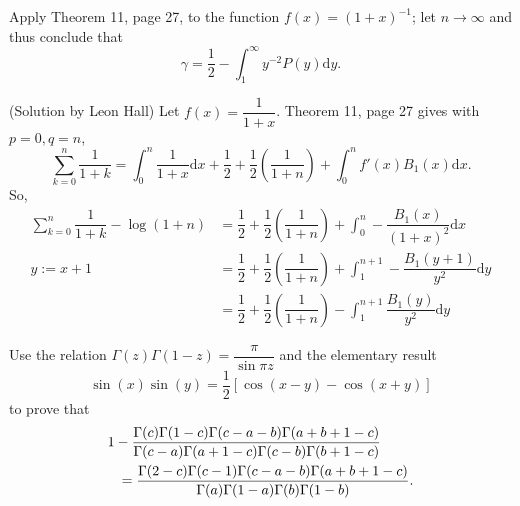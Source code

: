 \begin{problem}\label{problem14chapter2}
Apply Theorem 11, page 27, to the function $f(x) = (1+x)^{-1}$; let $n \rightarrow \infty$ and thus conclude that
$$\gamma = \dfrac{1}{2} - \displaystyle\int_1^{\infty} y^{-2} P(y) \mathrm{d}y.$$
\end{problem}
\begin{solution}(Solution by Leon Hall)
Let $f(x) = \dfrac{1}{1+x}$. Theorem 11, page 27 gives with $p=0, q=n$, 
$$\displaystyle\sum_{k=0}^n \dfrac{1}{1+k} = \displaystyle\int_0^n \dfrac{1}{1+x} \mathrm{d}x + \dfrac{1}{2} + \dfrac{1}{2} \left( \dfrac{1}{1+n} \right) + \displaystyle\int_0^n f'(x) B_1(x) \mathrm{d}x.$$
So,
$$\begin{array}{ll}
\displaystyle\sum_{k=0}^n \dfrac{1}{1+k} - \log(1+n) &= \dfrac{1}{2} + \dfrac{1}{2} \left( \dfrac{1}{1+n} \right) + \displaystyle\int_0^n - \dfrac{B_1(x)}{(1+x)^2} \mathrm{d}x \\
y:=x+1 &= \dfrac{1}{2} + \dfrac{1}{2} \left( \dfrac{1}{1+n} \right) + \displaystyle\int_1^{n+1} - \dfrac{B_1(y+1)}{y^2} \mathrm{d}y \\
&= \dfrac{1}{2} + \dfrac{1}{2} \left( \dfrac{1}{1+n} \right) - \displaystyle\int_1^{n+1} \dfrac{B_1(y)}{y^2} \mathrm{d}y
\end{array}$$
\end{solution}
\begin{problem}\label{problem15chapter2}
Use the relation $\Gamma(z) \Gamma(1-z) = \dfrac{\pi}{\sin \pi z}$ and the elementary result 
$$\sin(x)\sin(y) = \dfrac{1}{2} [ \cos (x-y) - \cos(x+y) ]$$
to prove that
\begin{eqnarray*}
\lefteqn{1 - \dfrac{\Gamma(c)\Gamma(1-c)\Gamma(c-a-b)\Gamma(a+b+1-c)}{\Gamma(c-a)\Gamma(a+1-c)\Gamma(c-b)\Gamma(b+1-c)}} \\
& &= \dfrac{\Gamma(2-c)\Gamma(c-1)\Gamma(c-a-b)\Gamma(a+b+1-c)}{\Gamma(a)\Gamma(1-a)\Gamma(b)\Gamma(1-b)}.
\end{eqnarray*}
\end{problem}
